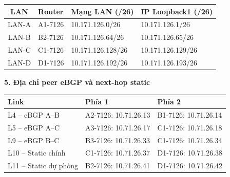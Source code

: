 \vspace{0.2cm}

\begin{table}[H]
\centering
\small
\begin{tabularx}{\textwidth}{
|c|l|X|X|
}
\hline

\textbf{LAN} &
\textbf{Router} &
\textbf{Mạng LAN (/26)} &
\textbf{IP Loopback1 (/26)} \\
\hline

LAN-A & A1-7126 &
10.171.126.0/26 &
10.171.126.1/26 \\
\hline

LAN-B & B2-7126 &
10.171.126.64/26 &
10.171.126.65/26 \\
\hline

LAN-C & C1-7126 &
10.171.126.128/26 &
10.171.126.129/26 \\
\hline

LAN-D & D1-7126 &
10.171.126.192/26 &
10.171.126.193/26 \\
\hline

\end{tabularx}
\end{table}

\vspace{0.4cm}

{\bfseries\large
5. Địa chỉ peer eBGP và next-hop static
}

\vspace{0.2cm}

\begin{table}[H]
\centering
\small
\begin{tabularx}{\textwidth}{
|l|X|X|
}
\hline

\textbf{Link} &
\textbf{Phía 1} &
\textbf{Phía 2} \\
\hline

L4 -- eBGP A--B &
A2-7126: 10.71.26.13 &
B1-7126: 10.71.26.14 \\
\hline

L5 -- eBGP A--C &
A3-7126: 10.71.26.17 &
C1-7126: 10.71.26.18 \\
\hline

L9 -- eBGP B--C &
B3-7126: 10.71.26.33 &
C1-7126: 10.71.26.34 \\
\hline

L10 -- Static chính &
C1-7126: 10.71.26.37 &
D1-7126: 10.71.26.38 \\
\hline

L11 -- Static dự phòng &
B2-7126: 10.71.26.41 &
D1-7126: 10.71.26.42 \\
\hline

\end{tabularx}
\end{table}

\vspace{0.2cm}

\vfill


\endgroup
\clearpage
